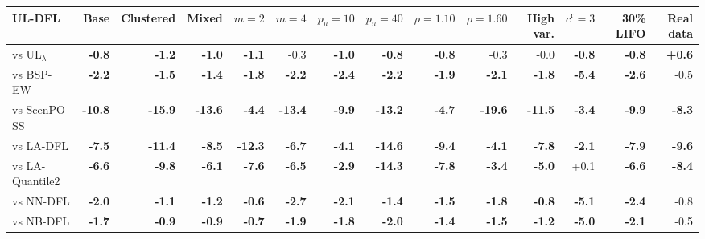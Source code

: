 \begin{tabular}{lrrrrrrrrrrrrr}
\toprule
UL-DFL & Base & Clustered & Mixed & $m=2$ & $m=4$ & $p_u=10$ & $p_u=40$ & $\rho=1.10$ & $\rho=1.60$ & High var. & $c^{\mathrm{r}}=3$ & 30\% LIFO & Real data \\
\midrule
vs UL$_\lambda$ & \textbf{-0.8} & \textbf{-1.2} & \textbf{-1.0} & \textbf{-1.1} & -0.3 & \textbf{-1.0} & \textbf{-0.8} & \textbf{-0.8} & -0.3 & -0.0 & \textbf{-0.8} & \textbf{-0.8} & \textbf{+0.6} \\
vs BSP-EW & \textbf{-2.2} & \textbf{-1.5} & \textbf{-1.4} & \textbf{-1.8} & \textbf{-2.2} & \textbf{-2.4} & \textbf{-2.2} & \textbf{-1.9} & \textbf{-2.1} & \textbf{-1.8} & \textbf{-5.4} & \textbf{-2.6} & -0.5 \\
vs ScenPO-SS & \textbf{-10.8} & \textbf{-15.9} & \textbf{-13.6} & \textbf{-4.4} & \textbf{-13.4} & \textbf{-9.9} & \textbf{-13.2} & \textbf{-4.7} & \textbf{-19.6} & \textbf{-11.5} & \textbf{-3.4} & \textbf{-9.9} & \textbf{-8.3} \\
vs LA-DFL & \textbf{-7.5} & \textbf{-11.4} & \textbf{-8.5} & \textbf{-12.3} & \textbf{-6.7} & \textbf{-4.1} & \textbf{-14.6} & \textbf{-9.4} & \textbf{-4.1} & \textbf{-7.8} & \textbf{-2.1} & \textbf{-7.9} & \textbf{-9.6} \\
vs LA-Quantile2 & \textbf{-6.6} & \textbf{-9.8} & \textbf{-6.1} & \textbf{-7.6} & \textbf{-6.5} & \textbf{-2.9} & \textbf{-14.3} & \textbf{-7.8} & \textbf{-3.4} & \textbf{-5.0} & +0.1 & \textbf{-6.6} & \textbf{-8.4} \\
vs NN-DFL & \textbf{-2.0} & \textbf{-1.1} & \textbf{-1.2} & \textbf{-0.6} & \textbf{-2.7} & \textbf{-2.1} & \textbf{-1.4} & \textbf{-1.5} & \textbf{-1.8} & \textbf{-0.8} & \textbf{-5.1} & \textbf{-2.4} & -0.8 \\
vs NB-DFL & \textbf{-1.7} & \textbf{-0.9} & \textbf{-0.9} & \textbf{-0.7} & \textbf{-1.9} & \textbf{-1.8} & \textbf{-2.0} & \textbf{-1.4} & \textbf{-1.5} & \textbf{-1.2} & \textbf{-5.0} & \textbf{-2.1} & -0.5 \\
\bottomrule
\end{tabular}
